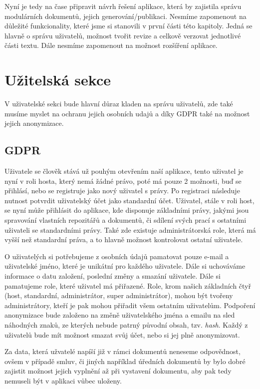 Nyní je tedy na čase připravit návrh řešení aplikace, která by zajistila správu modulárních dokumentů, jejich generování/publikaci. Nesmíme zapomenout
na důležité funkcionality, které jsme si stanovili v první části této kapitoly. Jedná se hlavně o správu uživatelů, možnost tvořit revize a celkově
verzovat jednotlivé části textu. Dále nesmíme zapomenout na možnost rozšíření aplikace.

\section{Užitelská sekce}

V uživatelské sekci bude hlavní důraz kladen na správu uživatelů, zde také musíme myslet na ochranu jejich osobních udajů a díky GDPR také na
možnost jejich anonymizace.

\subsection{GDPR}

Uživatele se člověk stává už pouhým otevřením naší aplikace, tento uživatel je nyní v roli hosta, který nemá žádné právo, poté má pouze 2 možnosti, buď se
přihlásí, nebo se registruje jako nový uživatel s právy. Po registraci následuje nutnost potvrdit uživatelský účet jako standardní účet.
Uživatel, stále v roli host, se nyní může přihlásit do aplikace, kde disponuje základními právy, jakými jsou spravování vlastních repozitářů a dokumentů,
či sdílení svých prací s ostatními uživateli se standardními právy. Také zde existuje administrátorská role, která má vyšší než standardní práva,
a to hlavně možnost kontrolovat ostatní uživatele.

O uživatelých si potřebujeme z osobních údajů pamatovat pouze e-mail a uživatelské jméno, které je unikátní pro každého uživatele. Dále si uchováváme
informace o datu založení, poslední změny a smazání uživatele. Dále si pamatujeme role, které uživatel má přiřazené. Role, krom našich základních čtyř
(host, standardní, administrátor, super administrátor), mohou být tvořeny administrátory, kteří je pak mohou přiřadit všem ostatním uživatelům. Podpoření
anonymizace bude založeno na změně uživatelského jména a emailu na sled náhodných znaků, ze kterých nebude patrný původní obsah, tzv. \textit{hash}. Každý z
uživatelů bude mít možnost smazat svůj účet, nebo si jej plně anonymizovat.

Za data, která užvatelé napíší již v rámci dokumentů neneseme odpovědnost, ovšem v případě smluv, či jiných například úředních dokumentů by bylo dobré
zajistit možnost jejich vyplnění až při vystavení dokumentu, aby pak tedy nemuseli být v aplikaci vůbec uloženy.

